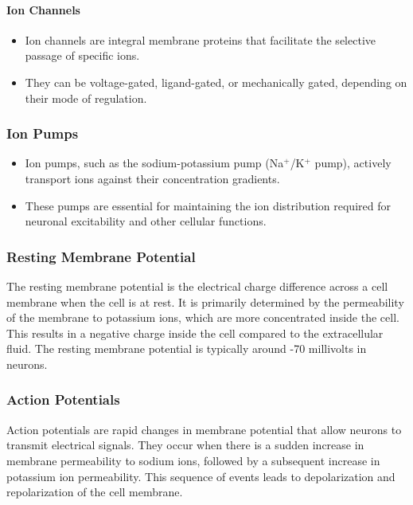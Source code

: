 \documentclass{article}
\begin{document}
\paragraph{Ion Channels}

\begin{itemize}
  \item Ion channels are integral membrane proteins that facilitate the selective passage of specific ions.
  \item They can be voltage-gated, ligand-gated, or mechanically gated, depending on their mode of regulation.
\end{itemize}

\subsubsection{Ion Pumps}

\begin{itemize}
  \item Ion pumps, such as the sodium-potassium pump (Na$^+$/K$^+$ pump), actively transport ions against their concentration gradients.
  \item These pumps are essential for maintaining the ion distribution required for neuronal excitability and other cellular functions.
\end{itemize}

\subsubsection{Resting Membrane Potential}

The resting membrane potential is the electrical charge difference across a cell membrane when the cell is at rest. It is primarily determined by the permeability of the membrane to potassium ions, which are more concentrated inside the cell. This results in a negative charge inside the cell compared to the extracellular fluid. The resting membrane potential is typically around -70 millivolts in neurons.

\subsubsection{Action Potentials}

Action potentials are rapid changes in membrane potential that allow neurons to transmit electrical signals. They occur when there is a sudden increase in membrane permeability to sodium ions, followed by a subsequent increase in potassium ion permeability. This sequence of events leads to depolarization and repolarization of the cell membrane.
\end{document}
